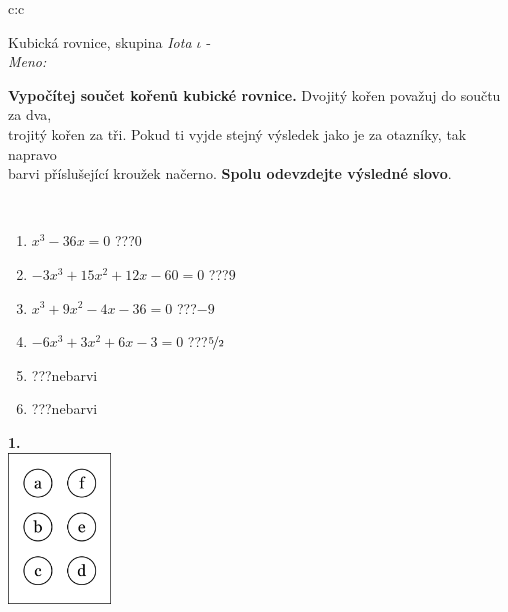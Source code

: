 \documentclass[10pt]{report}
\begin{document}
\begin{tabular}{c:c}
\begin{minipage}[c][104.5mm][t]{0.5\linewidth}
\begin{center}
\vspace{7mm}
{\huge Kubická rovnice, skupina \textit{Iota $\iota$} -}\\[5mm]
\textit{Meno:}\phantom{xxxxxxxxxxxxxxxxxxxxxxxxxxxxxxxxxxxxxxxxxxxxxxxxxxxxxxxxxxxxxxxxx}\\[5mm]
\begin{minipage}{0.95\linewidth}
\textbf{Vypočítej součet kořenů kubické rovnice.} Dvojitý kořen považuj do součtu za dva,\\trojitý kořen za tři. Pokud ti vyjde stejný výsledek jako je za otazníky, tak napravo\\barvi příslušející kroužek načerno. \textbf{Spolu odevzdejte výsledné slovo}.
\end{minipage}
\\[1mm]
\begin{minipage}{0.79\linewidth}
\begin{center}
\begin{varwidth}{\linewidth}
\begin{enumerate}
\Large
\item $x^3-36x=0$\quad \dotfill\; ???\;\dotfill \quad $0$
\item $-3x^3+15x^2+12x-60=0$\quad \dotfill\; ???\;\dotfill \quad $9$
\item $x^3+9x^2-4x-36=0$\quad \dotfill\; ???\;\dotfill \quad $-9$
\item $-6x^3+3x^2+6x-3=0$\quad \dotfill\; ???\;\dotfill \quad $\nicefrac{5}{2}$
\item \quad \dotfill\; ???\;\dotfill \quad nebarvi
\item \quad \dotfill\; ???\;\dotfill \quad nebarvi
\end{enumerate}
\end{varwidth}
\end{center}
\end{minipage}
\begin{minipage}{0.20\linewidth}
\begin{center}
{\Huge\bfseries 1.} \\[2mm]
\includegraphics[height=40mm]{../images/braille.png}

\end{center}
\end{minipage}
\end{center}
\end{minipage}
\end{tabular}
\end{document}
